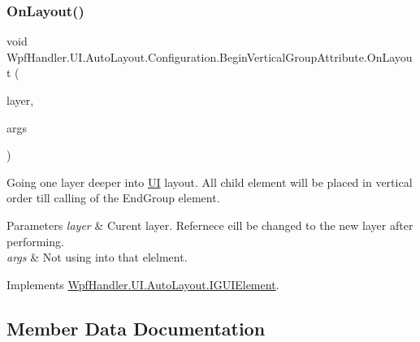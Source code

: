 \subsubsection{\texorpdfstring{On\+Layout()}{OnLayout()}}
{\footnotesize\ttfamily void Wpf\+Handler.\+U\+I.\+Auto\+Layout.\+Configuration.\+Begin\+Vertical\+Group\+Attribute.\+On\+Layout (\begin{DoxyParamCaption}\item[{ref \mbox{\hyperlink{class_wpf_handler_1_1_u_i_1_1_auto_layout_1_1_layout_layer}{Layout\+Layer}}}]{layer,  }\item[{params object \mbox{[}$\,$\mbox{]}}]{args }\end{DoxyParamCaption})}



Going one layer deeper into \mbox{\hyperlink{namespace_wpf_handler_1_1_u_i}{UI}} layout. All child element will be placed in vertical order till calling of the End\+Group element. 


\begin{DoxyParams}{Parameters}
{\em layer} & Curent layer. Refernece eill be changed to the new layer after performing.\\
\hline
{\em args} & Not using into that elelment.\\
\hline
\end{DoxyParams}


Implements \mbox{\hyperlink{interface_wpf_handler_1_1_u_i_1_1_auto_layout_1_1_i_g_u_i_element_a0ff16956f8e8187d51e1b36b6b9f894e}{Wpf\+Handler.\+U\+I.\+Auto\+Layout.\+I\+G\+U\+I\+Element}}.



\subsection{Member Data Documentation}
\mbox{\label{class_wpf_handler_1_1_u_i_1_1_auto_layout_1_1_configuration_1_1_begin_vertical_group_attribute_ac18db79463ee3229241875a881b71c48}} 
